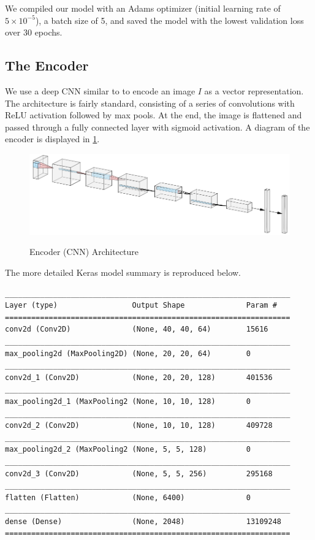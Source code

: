 \documentclass[12pt]{article}
\begin{document}
We compiled our model with an Adams optimizer (initial learning rate of \(5 \times 10^{-5}\)), a batch size of 5, and saved the model with the lowest validation loss over 30 epochs.

\subsection{The Encoder} \label{subsec:the_encoder}

We use a deep CNN similar to \citet{tds} to encode an image \(I\) as a vector representation. The architecture is fairly standard, consisting of a series of convolutions with ReLU activation followed by max pools. At the end, the image is flattened and passed through a fully connected layer with sigmoid activation. A diagram of the encoder is displayed in \cref{fig:encoder}.

\begin{figure}[H]
    \centering
    \caption{Encoder (CNN) Architecture}
    \includegraphics[width=.9\textwidth]{encoder.png}
    \label{fig:encoder}
\end{figure}

The more detailed Keras model summary is reproduced below.
\begin{lstlisting}
_________________________________________________________________
Layer (type)                 Output Shape              Param #
=================================================================
conv2d (Conv2D)              (None, 40, 40, 64)        15616
_________________________________________________________________
max_pooling2d (MaxPooling2D) (None, 20, 20, 64)        0
_________________________________________________________________
conv2d_1 (Conv2D)            (None, 20, 20, 128)       401536
_________________________________________________________________
max_pooling2d_1 (MaxPooling2 (None, 10, 10, 128)       0
_________________________________________________________________
conv2d_2 (Conv2D)            (None, 10, 10, 128)       409728
_________________________________________________________________
max_pooling2d_2 (MaxPooling2 (None, 5, 5, 128)         0
_________________________________________________________________
conv2d_3 (Conv2D)            (None, 5, 5, 256)         295168
_________________________________________________________________
flatten (Flatten)            (None, 6400)              0
_________________________________________________________________
dense (Dense)                (None, 2048)              13109248
=================================================================
\end{lstlisting}
\end{document}
